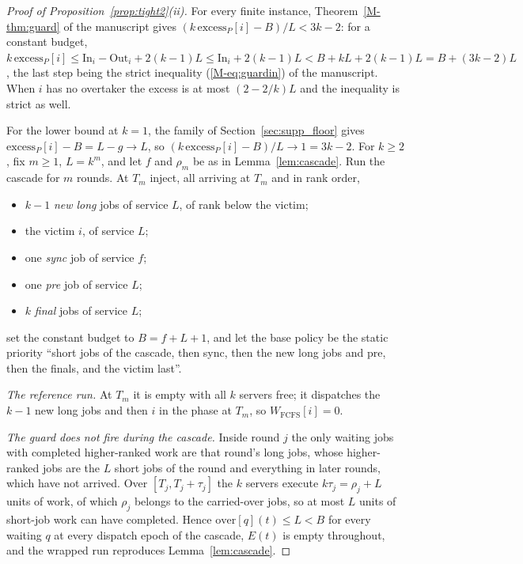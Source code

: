 \documentclass[mathematics,supfile,submit,moreauthors]{Definitions/mdpi}
\begin{document}
\begin{proof}[Proof of Proposition~\ref{prop:tight2}(ii)]
For every finite instance, Theorem~\ref*{M-thm:guard} of the manuscript gives
$(k\,\mathrm{excess}_P[i]-B)/L<3k-2$: for a constant budget,
$k\,\mathrm{excess}_P[i] \le \mathrm{In}_i - \mathrm{Out}_i + 2(k-1)L
 \le \mathrm{In}_i + 2(k-1)L < B + kL + 2(k-1)L = B + (3k-2)L$, the last step
being the strict inequality (\ref*{M-eq:guardin}) of the manuscript. When $i$ has no overtaker the
excess is at most $(2-2/k)L$ and the inequality is strict as well.

For the lower bound at $k = 1$, the family of Section~\ref{sec:supp_floor} gives
$\mathrm{excess}_P[i] - B = L - g \to L$, so
$(k\,\mathrm{excess}_P[i] - B)/L \to 1 = 3k - 2$. For $k \ge 2$, fix $m \ge 1$, $L = k^m$, and let $f$ and
$\rho_m$ be as in Lemma~\ref{lem:cascade}. Run the cascade for $m$ rounds. At
$T_m$ inject, all arriving at $T_m$ and in rank order,
\begin{itemize}
  \item $k-1$ \emph{new long} jobs of service $L$, of rank below the victim;
  \item the victim $i$, of service $L$;
  \item one \emph{sync} job of service $f$;
  \item one \emph{pre} job of service $L$;
  \item $k$ \emph{final} jobs of service $L$;
\end{itemize}
set the constant budget to $B = f + L + 1$, and let the base policy be the static
priority ``short jobs of the cascade, then sync, then the new long jobs and pre,
then the finals, and the victim last''.

\emph{The reference run.} At $T_m$ it is empty with all $k$ servers free; it
dispatches the $k-1$ new long jobs and then $i$ in the phase at $T_m$, so
$W_{\mathrm{FCFS}}[i] = 0$.

\emph{The guard does not fire during the cascade.} Inside round $j$ the only
waiting jobs with completed higher-ranked work are that round's long jobs, whose
higher-ranked jobs are the $L$ short jobs of the round and everything in later
rounds, which have not arrived. Over $[T_j, T_j + \tau_j]$ the $k$ servers
execute $k\tau_j = \rho_j + L$ units of work, of which $\rho_j$ belongs to the
carried-over jobs, so at most $L$ units of short-job work can have completed.
Hence $\mathrm{over}[q](t) \le L < B$ for every waiting $q$ at every dispatch
epoch of the cascade, $E(t)$ is empty throughout, and the wrapped run reproduces
Lemma~\ref{lem:cascade}.


\end{proof}
\end{document}
